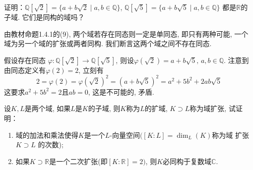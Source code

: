 \begin{problem}
    证明：$\mathbb{Q}[\sqrt 2] = \{a + b\sqrt 2 \mid a, b \in \mathbb{Q}\}$,
$\mathbb{Q}[\sqrt 5] = \{a + b\sqrt 5 \mid a, b \in \mathbb{Q}\}$
都是$\mathbb{R}$的子域. 它们是同构的域吗？
\end{problem}

\begin{solution}
    由教材命题1.4.1的(9), 两个域若存在同态则一定是单同态, 即只有两种可能, 
    一个域为另一个域的扩张或两者同构. 我们断言这两个域之间不存在同态.
    
    假设存在同态
$\varphi: \mathbb{Q}[\sqrt{2}] \to \mathbb{Q}[\sqrt{5}]$,
则设$\varphi(\sqrt{2}) = a + b\sqrt{5},\, a, b \in \mathbb{Q}$.
注意到由同态定义有$\varphi(2) = 2$, 立刻有
\[
    2 = \varphi(2) = \varphi(\sqrt{2})^2 = (a + b\sqrt{5})^2 = a^2 + 5b^2 + 2ab\sqrt{5}
\]
这要求$a^2 + 5b^2 = 2$且$ab = 0$, 这是不可能的, 矛盾.
\end{solution}

\begin{problem}
    设$K, L$是两个域, 如果$L$是$K$的子域, 则$K$称为$L$的扩域,
$K \supset L$称为域扩张, 试证明：
\begin{enumerate}[(1)]
    \item 域的加法和乘法使得$K$是一个$L$-向量空间$([K:L] = \dim_L(K)$称为域
扩张$K \supset L$ 的次数);
    \item 如果$K \supset \mathbb{R}$是一个二次扩张(即$[K:\mathbb{R}] = 2)$,
则$K$必同构于复数域$\mathbb{C}$.
\end{enumerate}
\end{problem}


